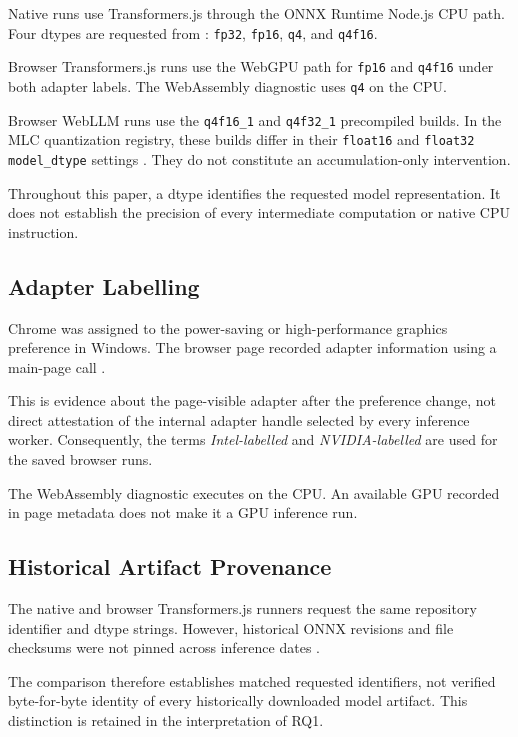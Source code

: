 \documentclass[conference]{IEEEtran}
\newcommand{\fp}{\texttt{fp32}}
\newcommand{\fphalf}{\texttt{fp16}}
\newcommand{\qfour}{\texttt{q4}}
\newcommand{\qfourhalf}{\texttt{q4f16}}
\newcommand{\mlchalf}{\texttt{q4f16\_1}}
\newcommand{\mlcfull}{\texttt{q4f32\_1}}
\begin{document}
Native runs use Transformers.js through the ONNX Runtime
Node.js CPU path. Four dtypes are requested from
:
\fp{}, \fphalf{}, \qfour{}, and \qfourhalf{}.

Browser Transformers.js runs use the WebGPU path for
\fphalf{} and \qfourhalf{} under both adapter labels.
The WebAssembly diagnostic uses \qfour{} on the CPU.

Browser WebLLM runs use the \mlchalf{} and \mlcfull{}
precompiled builds. In the MLC quantization registry,
these builds differ in their \texttt{float16} and
\texttt{float32} \texttt{model\_dtype} settings \cite{mlc}.
They do not constitute an accumulation-only intervention.

Throughout this paper, a dtype identifies the requested
model representation. It does not establish the precision
of every intermediate computation or native CPU instruction.


\subsection{Adapter Labelling}

Chrome was assigned to the power-saving or high-performance
graphics preference in Windows. The browser page recorded
adapter information using a main-page
 call
\cite{repository}.

This is evidence about the page-visible adapter after the
preference change, not direct attestation of the internal
adapter handle selected by every inference worker.
Consequently, the terms \emph{Intel-labelled} and
\emph{NVIDIA-labelled} are used for the saved browser runs.

The WebAssembly diagnostic executes on the CPU.
An available GPU recorded in page metadata does not make it
a GPU inference run.


\subsection{Historical Artifact Provenance}

The native and browser Transformers.js runners request the
same repository identifier and dtype strings. However,
historical ONNX revisions and file checksums were not pinned
across inference dates \cite{repository}.

The comparison therefore establishes matched requested
identifiers, not verified byte-for-byte identity of every
historically downloaded model artifact. This distinction is
retained in the interpretation of RQ1.
\end{document}
